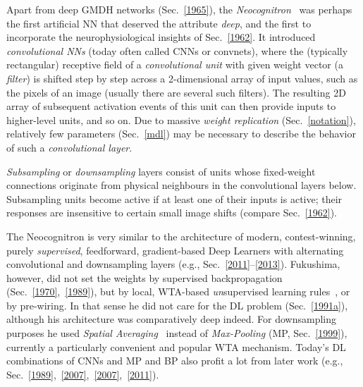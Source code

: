\documentclass[letterpaper]{article}
\begin{document}
\begin{sloppypar}
Apart from deep GMDH networks (Sec.~\ref{1965}),
the {\em Neocognitron}~\citep{Fukushima:1979neocognitron,fukushima:1980,Fukushima:2013}
was perhaps the first artificial NN that deserved the attribute {\em deep}, and the first 
to incorporate the  neurophysiological insights of Sec.~\ref{1962}. 
It introduced {\em convolutional NNs} (today often called CNNs or convnets), where the
(typically rectangular) receptive field of a {\em convolutional unit} with given weight vector (a {\em filter})
is shifted step by step across a 2-dimensional array of input values, such as the pixels of an image (usually there are several such filters). 
The resulting 2D array of subsequent activation events of this unit can then provide inputs to higher-level units, and so on.
Due to massive {\em weight replication} (Sec.~\ref{notation}),  
relatively few parameters (Sec.~\ref{mdl}) 
may be necessary to describe the behavior of such a {\em convolutional layer}.

{\em Subsampling} or {\em downsampling} layers consist of units whose fixed-weight connections originate from physical neighbours in the convolutional layers below. 
Subsampling units become active if at least one of their inputs is active;
their responses are insensitive to certain small image shifts (compare Sec.~\ref{1962}).



The Neocognitron is
very similar to the architecture of modern, contest-winning, purely {\em  supervised}, 
feedforward, gradient-based Deep Learners with alternating convolutional and downsampling layers
(e.g., Sec.~\ref{2011}--\ref{2013}).
Fukushima, however, did not set the weights by supervised
backpropagation (Sec.~\ref{1970},~\ref{1989}),
but by local, WTA-based
{\em un}supervised learning rules~\citep[e.g.,][]{Fukushima:2013b}, or by pre-wiring. 
In that sense he did not care for the  
DL problem (Sec.~\ref{1991a}), 
although his architecture was comparatively deep indeed. For downsampling purposes
he used {\em  Spatial Averaging}~\citep{fukushima:1980,Fukushima:2011} instead of {\em Max-Pooling} (MP, Sec.~\ref{1999}),
currently a particularly convenient and popular WTA mechanism. 
Today's DL combinations of CNNs and MP and BP also profit a lot from
later work (e.g., Sec.~\ref{1989},~\ref{2007},~\ref{2007},~\ref{2011}).



\end{sloppypar}
\end{document}
